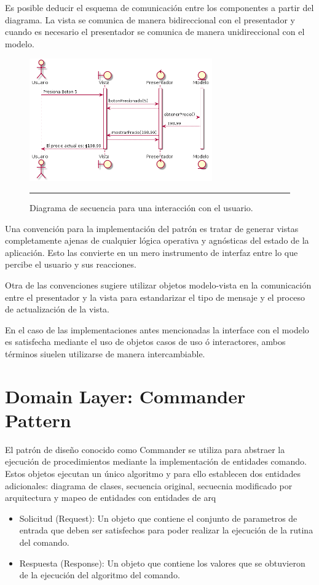 Es posible deducir el esquema de comunicación entre los componentes a partir del diagrama. La vista se comunica de manera bidireccional con el presentador y cuando es necesario el presentador se comunica de manera unidireccional con el modelo.

\begin{figure}[htbp]
	\centering
	\includegraphics[width=0.7\textwidth]{Figures/uml_mvp_sequence.png}
	\rule{35em}{1pt}
	\caption[MVP Sequence]{Diagrama de secuencia para una interacción con el usuario.}
	\label{fig:uml_mvp_sequence}
\end{figure}

Una convención para la implementación del patrón es tratar de generar vistas completamente ajenas de cualquier lógica operativa y agnósticas del estado de la aplicación. Esto las convierte en un mero instrumento de interfaz entre lo que percibe el usuario y sus reacciones. 

Otra de las convenciones sugiere utilizar objetos modelo-vista en la comunicación entre el presentador y la vista para estandarizar el tipo de mensaje y el proceso de actualización de la vista.

En el caso de las implementaciones antes mencionadas la interface con el modelo es satisfecha mediante el uso de objetos casos de uso ó interactores, ambos términos siuelen utilizarse de manera intercambiable.

\section{Domain Layer: Commander Pattern}
El patrón de diseño conocido como Commander se utiliza para abstraer la ejecución de procedimientos mediante la implementación de entidades comando. Estos objetos ejecutan un único algoritmo y para ello establecen dos entidades adicionales: 
\Agregar diagrama de clases, secuencia original, secuecnia modificado por arquitectura y mapeo de entidades con entidades de arq
\begin{itemize}
	\item Solicitud (Request): Un objeto que contiene el conjunto de parametros de entrada que deben ser satisfechos para poder realizar la ejecución de la rutina del comando.
	\item Respuesta (Response): Un objeto que contiene los valores que se obtuvieron de la ejecución del algoritmo del comando.
\end{itemize}

